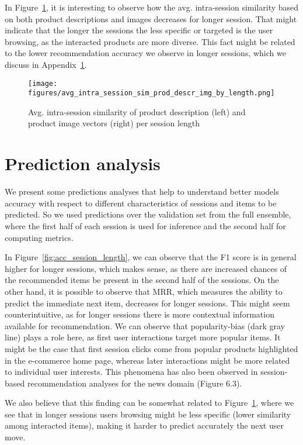 \documentclass[sigconf,screen]{acmart}
\begin{document}
In Figure~\ref{fig:sim_by_session}, it is interesting to observe how the avg. intra-session similarity based on both product descriptions and images decreases for longer session. That might indicate that the longer the sessions the less specific or targeted is the user browsing, as the interacted products are more diverse. This fact might be related to the lower recommendation accuracy we observe in longer sessions, which we discuss in Appendix~\ref{sec:pred_analysis}.

\begin{figure}[ht]
  \centering
  \texttt{[image: figures/avg\_intra\_session\_sim\_prod\_descr\_img\_by\_length.png]}
  \caption{Avg. intra-session similarity of product description (left) and product image vectors (right) per session length}
  \label{fig:sim_by_session}
\end{figure}


\section{Prediction analysis}
\label{sec:pred_analysis}

We present some predictions analyses that help to understand better models accuracy with respect to different characteristics of sessions and items to be predicted. So we used predictions over the validation set from the full ensemble, where the first half of each session is used for inference and the second half for computing  metrics.

In Figure~\ref{fig:acc_session_length}, we can observe that the F1 score is in general higher for longer sessions, which makes sense, as there are increased chances of the recommended items be present in the second half of the sessions.  On the other hand, it is possible to observe that MRR, which measures the ability to predict the immediate next item, decreases for longer sessions. This might seem counterintuitive, as for longer sessions there is more contextual information available for recommendation. We can observe that popularity-bias (dark gray line) plays a role here, as first user interactions target more popular items. It might be the case that first session clicks come from popular products highlighted in the e-commerce home page, whereas later interactions might be more related to individual user interests. This phenomena has also been observed in session-based recommendation analyses for the news domain \cite{moreira2019chameleon} (Figure 6.3).

We also believe that this finding can be somewhat related to Figure~\ref{fig:sim_by_session}, where we see that in longer sessions users browsing might be less specific (lower similarity among interacted items), making it harder to predict accurately the next user move.
\end{document}
